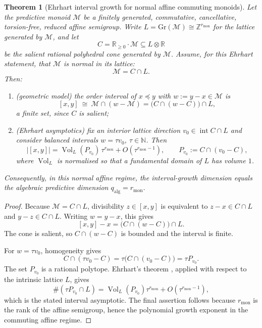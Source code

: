 \documentclass[11pt]{article}
\newtheorem{theorem}{Theorem}[section]
\theoremstyle{definition}
\theoremstyle{remark}
\newcommand{\N}{\mathbb{N}}
\newcommand{\Z}{\mathbb{Z}}
\newcommand{\R}{\mathbb{R}}
\newcommand{\M}{\mathcal{M}}
\newcommand{\qalg}{q_{\mathrm{alg}}}
\newcommand{\rmon}{r_{\mathrm{mon}}}
\begin{document}
\begin{theorem}[Ehrhart interval growth for normal affine commuting monoids]
\label{thm:ehrhart-order}
Let the predictive monoid $\M$ be a finitely generated, commutative,
cancellative, torsion-free, reduced affine semigroup.  Write
$L=\mathrm{Gr}(\M)\cong\Z^{\rmon}$ for the lattice generated by $\M$, and let
\[
  C=\R_{\ge0}\!\cdot\!\M\subseteq L\otimes\R
\]
be the salient rational polyhedral cone generated by $\M$.  Assume, for this
Ehrhart statement, that $\M$ is normal in its lattice:
\[
  \M=C\cap L .
\]
Then:
\begin{enumerate}[label=\textup{(\roman*)},leftmargin=2.4em]
\item \textup{(geometric model)} the order interval of $x\preceq y$ with
      $w:=y-x\in\M$ is
      \[
        [x,y]\ \cong\ \M\cap(w-\M)
        =\bigl(C\cap(w-C)\bigr)\cap L,
      \]
      a finite set, since $C$ is salient;
\item \textup{(Ehrhart asymptotics)} fix an interior lattice direction
      $v_0\in\operatorname{int}C\cap L$ and consider balanced intervals
      $w=\tau v_0$, $\tau\in\N$.  Then
      \[
        |[x,y]|
        =\operatorname{Vol}_L(P_{v_0})\,\tau^{\rmon}
        +O(\tau^{\rmon-1}),
        \qquad
        P_{v_0}:=C\cap(v_0-C),
      \]
      where $\operatorname{Vol}_L$ is normalised so that a fundamental domain of
      $L$ has volume $1$.
\end{enumerate}
Consequently, in this normal affine regime, the interval-growth dimension equals
the algebraic predictive dimension $\qalg=\rmon$.
\end{theorem}

\begin{proof}
Because $\M=C\cap L$, divisibility $z\in[x,y]$ is equivalent to
$z-x\in C\cap L$ and $y-z\in C\cap L$.  Writing $w=y-x$, this gives
\[
  [x,y]-x=\bigl(C\cap(w-C)\bigr)\cap L .
\]
The cone is salient, so $C\cap(w-C)$ is bounded and the interval is finite.

For $w=\tau v_0$, homogeneity gives
\[
  C\cap(\tau v_0-C)=\tau\bigl(C\cap(v_0-C)\bigr)=\tau P_{v_0}.
\]
The set $P_{v_0}$ is a rational polytope.  Ehrhart's theorem
\cite{stanley,brunsgubeladze,beckrobins2007}, applied with respect to the
intrinsic lattice $L$, gives
\[
  \#(\tau P_{v_0}\cap L)
  =\operatorname{Vol}_L(P_{v_0})\tau^{\rmon}+O(\tau^{\rmon-1}),
\]
which is the stated interval asymptotic.  The final assertion follows because
$\rmon$ is the rank of the affine semigroup, hence the polynomial growth exponent
in the commuting affine regime.
\end{proof}
\end{document}
